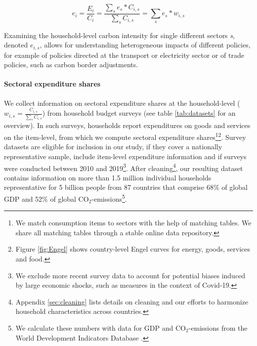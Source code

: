 \documentclass[12pt, a4paper]{article}
\begin{document}

\begin{equation} \label{eq:ei}
e_{i} = \frac{E_{i}}{C_{i}} = \frac{\sum_{s} e_{s}*C_{i,s}}{\sum_{s} C_{i,s}} = \sum_{s} e_{s}*w_{i,s}
\end{equation}


Examining the household-level carbon intensity for single different sectors \textit{s}, denoted $e_{i,s}$, allows for understanding heterogeneous impacts of different policies, for example of policies directed at the transport or electricity sector or of trade policies, such as carbon border adjustments.

\paragraph{Sectoral expenditure shares} We collect information on sectoral expenditure shares at the household-level ($w_{i,s}=\frac{C_{i,s}}{\sum_{s}C_{i,s}}$) from household budget surveys (see table \ref{tab:datasets} for an overview). In such surveys, households report expenditures on goods and services on the item-level, from which we compute sectoral expenditure shares\footnote{We match consumption items to sectors with the help of matching tables. We share all matching tables through a stable online data repository.}\footnote{Figure \ref{fig:Engel} shows country-level Engel curves for energy, goods, services and food.}. Survey datasets are eligible for inclusion in our study, if they cover a nationally representative sample, include item-level expenditure information and if surveys were conducted between 2010 and 2019\footnote{We exclude more recent survey data to account for potential biases induced by large economic shocks, such as measures in the context of Covid-19.}. After cleaning\footnote{Appendix \ref{sec:cleaning} lists details on cleaning and our efforts to harmonize household characteristics across countries.}, our resulting dataset contains information on more than 1.5 million individual households representative for 5 billion people from 87 countries that comprise 68\% of global GDP and 52\% of global CO$_{2}$-emissions\footnote{We calculate these numbers with data for GDP and CO$_{2}$-emissions from the World Development Indicators Database \autocite{WorldBankGroup.2023}.}.
\end{document}
